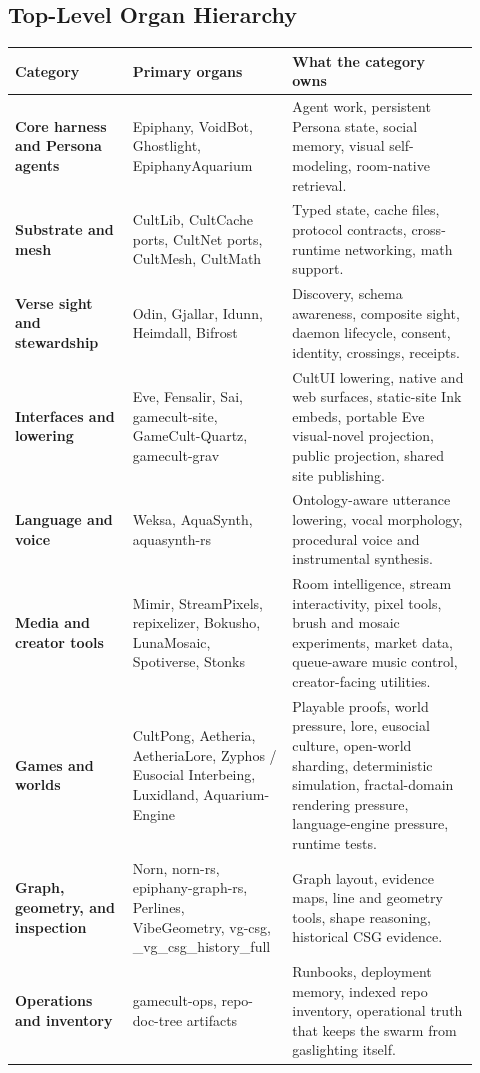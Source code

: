 \documentclass[11pt,oneside]{article}
\begin{document}
\subsection{Top-Level Organ Hierarchy}

\begin{longtable}{>{\bfseries}p{0.24\linewidth}p{0.30\linewidth}p{0.38\linewidth}}
\toprule
Category & Primary organs & What the category owns\\
\midrule
Core harness and Persona agents & Epiphany, VoidBot, Ghostlight, EpiphanyAquarium & Agent work, persistent Persona state, social memory, visual self-modeling, room-native retrieval.\\
Substrate and mesh & CultLib, CultCache ports, CultNet ports, CultMesh, CultMath & Typed state, cache files, protocol contracts, cross-runtime networking, math support.\\
Verse sight and stewardship & Odin, Gjallar, Idunn, Heimdall, Bifrost & Discovery, schema awareness, composite sight, daemon lifecycle, consent, identity, crossings, receipts.\\
Interfaces and lowering & Eve, Fensalir, Sai, gamecult-site, GameCult-Quartz, gamecult-grav & CultUI lowering, native and web surfaces, static-site Ink embeds, portable Eve visual-novel projection, public projection, shared site publishing.\\
Language and voice & Weksa, AquaSynth, aquasynth-rs & Ontology-aware utterance lowering, vocal morphology, procedural voice and instrumental synthesis.\\
Media and creator tools & Mimir, StreamPixels, repixelizer, Bokusho, LunaMosaic, Spotiverse, Stonks & Room intelligence, stream interactivity, pixel tools, brush and mosaic experiments, market data, queue-aware music control, creator-facing utilities.\\
Games and worlds & CultPong, Aetheria, AetheriaLore, Zyphos / Eusocial Interbeing, Luxidland, Aquarium-Engine & Playable proofs, world pressure, lore, eusocial culture, open-world sharding, deterministic simulation, fractal-domain rendering pressure, language-engine pressure, runtime tests.\\
Graph, geometry, and inspection & Norn, norn-rs, epiphany-graph-rs, Perlines, VibeGeometry, vg-csg, \_vg\_csg\_history\_full & Graph layout, evidence maps, line and geometry tools, shape reasoning, historical CSG evidence.\\
Operations and inventory & gamecult-ops, repo-doc-tree artifacts & Runbooks, deployment memory, indexed repo inventory, operational truth that keeps the swarm from gaslighting itself.\\
\bottomrule
\end{longtable}
\end{document}
